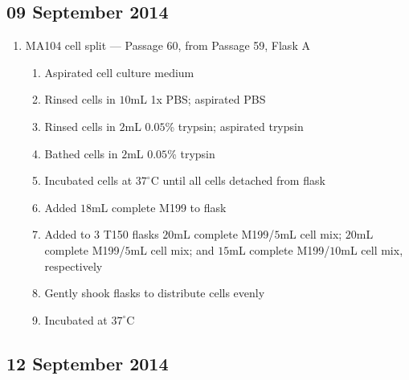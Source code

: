 
\subsection*{09 September 2014}

\begin{enumerate}
	\item MA104 cell split --- Passage 60, from Passage 59, Flask A
		\begin{enumerate}
			\item Aspirated cell culture medium
			\item Rinsed cells in $10$mL 1x PBS; aspirated PBS
			\item Rinsed cells in $2$mL $0.05$\% trypsin; aspirated trypsin
			\item Bathed cells in $2$mL $0.05$\% trypsin
			\item Incubated cells at $37^{\circ}$C until all cells detached from flask
			\item Added $18$mL complete M199 to flask
			\item Added to $3$ T150 flasks $20$mL complete M199/$5$mL cell mix; $20$mL complete M199/$5$mL cell mix; and $15$mL complete M199/$10$mL cell mix, respectively
			\item Gently shook flasks to distribute cells evenly
			\item Incubated at $37^{\circ}$C
		\end{enumerate}
\end{enumerate}

\subsection*{12 September 2014}

